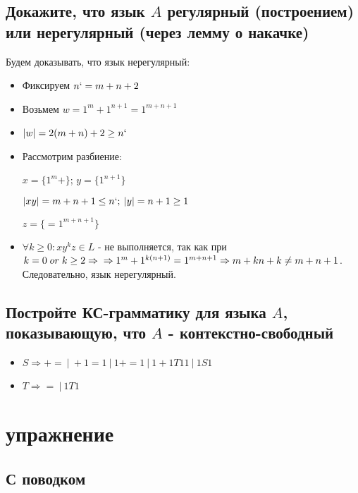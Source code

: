 \documentclass{article}
\begin{document}
    \subsection{Докажите, что язык $A$ регулярный (построением) или нерегулярный (через лемму о накачке)}
 
        Будем доказывать, что язык нерегулярный:
 
        \begin{itemize}
            \item Фиксируем $n` = m + n + 2$
            \item Возьмем $w = 1^m + 1^{n+1} = 1^{m+n+1}$
            \item $|w| = 2(m + n) + 2 \geq n`$
            \item Рассмотрим разбиение:
 
            $x = \{1^m+\}$;    $y = \{1^{n+1}\}$
 
            $|xy| = m + n + 1 \leq n`; \: |y| = n + 1 \geq 1$
 
             $z = \{=1^{m+n+1}\}$
 
            \item $\forall k \geq 0: xy^kz \in L$ - не выполняется, так как при $k = 0 \;or\; k \geq 2 \Rightarrow \newline \Rightarrow  1^m + 1^{k(n+1)} = 1^{m+n+1} \Rightarrow m + kn + k \neq m + n + 1$.  \newline Следовательно, язык нерегулярный.
        \end{itemize}
 
    \subsection{Постройте КС-грамматику для языка $A$, показывающую, что $A$ - контекстно-свободный}
 
        \begin{itemize}
            \item $S \Rightarrow += \: | \:+1=1 \: | \: 1+=1  \: | \: 1+1T11 \: | \: 1S1$
 
            \item $T \Rightarrow = \: | \: 1T1 $
        \end{itemize}
        
        \section{упражнение}
 
    \subsection{С поводком}
 
\end{document}

